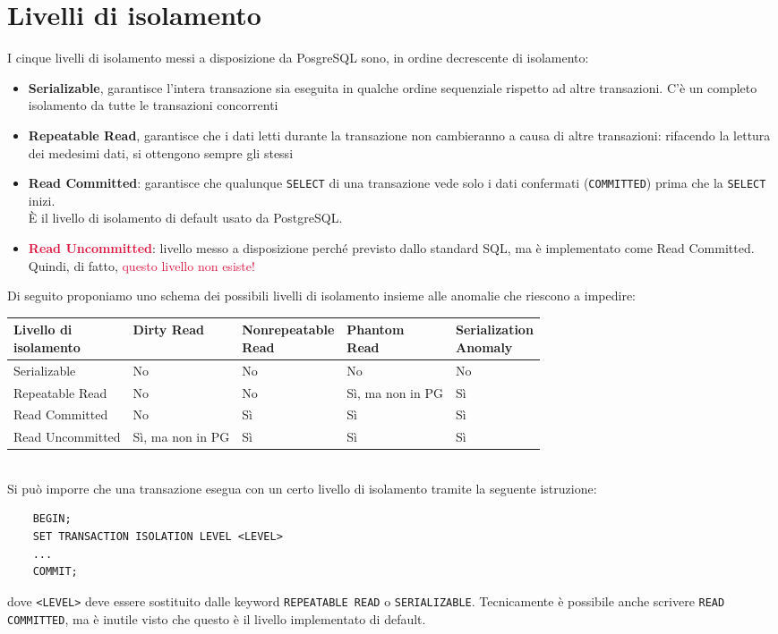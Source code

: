 \documentclass[12pt,a4paper]{book}
\begin{document}
	\section{Livelli di isolamento}
	I cinque livelli di isolamento messi a disposizione da PosgreSQL sono, in ordine decrescente di isolamento:
	\begin{itemize}
		\item \textbf{Serializable}, garantisce l'intera transazione sia eseguita in qualche ordine sequenziale rispetto ad altre transazioni. C'è un completo isolamento da tutte le transazioni concorrenti
		\item \textbf{Repeatable Read}, garantisce che i dati letti durante la transazione non cambieranno a causa di altre transazioni: rifacendo la lettura dei medesimi dati, si ottengono sempre gli stessi
		\item \textbf{Read Committed}: garantisce che qualunque \texttt{SELECT} di una transazione vede solo i dati confermati (\texttt{COMMITTED}) prima che la \texttt{SELECT} inizi. \\È il livello di isolamento di default usato da PostgreSQL.
		\item \textcolor{crimson}{\textbf{Read Uncommitted}}: livello messo a disposizione perché previsto dallo standard SQL, ma è implementato come Read Committed. Quindi, di fatto, \textcolor{crimson}{questo livello non esiste!}
	\end{itemize}	
	Di seguito proponiamo uno schema dei possibili livelli di isolamento insieme alle anomalie che riescono a impedire:\vspace{10px}\\
	\begin{tabular}{|l l l l l|}
		\hline
		\makecell[l]{Livello di\\ isolamento} & Dirty Read & \makecell[l]{Nonrepeatable \\Read} & \makecell[l]{Phantom\\ Read}& \makecell[l]{Serialization\\Anomaly}\\
		\hline
		Serializable & No & No & No & No\\
		Repeatable Read & No & No & Sì, ma non in PG & Sì\\
		Read Committed & No & Sì & Sì & Sì\\
		Read Uncommitted & Sì, ma non in PG & Sì & Sì & Sì\\
		\hline
	\end{tabular}\vspace{10px}\\
	Si può imporre che una transazione esegua con un certo livello di isolamento tramite la seguente istruzione:
	\begin{lstlisting}
	BEGIN;
	SET TRANSACTION ISOLATION LEVEL <LEVEL>
	...
	COMMIT;
	\end{lstlisting}
	dove \texttt{<LEVEL>} deve essere sostituito dalle keyword \texttt{REPEATABLE READ} o \texttt{SERIALIZABLE}. Tecnicamente è possibile anche scrivere \texttt{READ COMMITTED}, ma è inutile visto che questo è il livello implementato di default. \\
\end{document}
